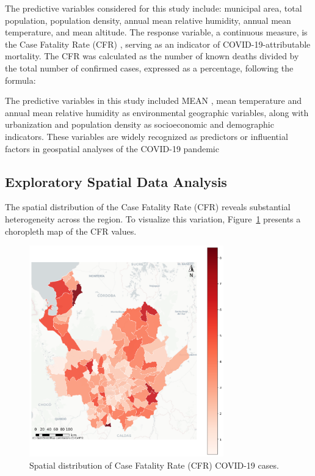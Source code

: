 \documentclass[a4paper,fleqn]{cas-sc}
\begin{document}
The predictive variables considered for this study include: municipal area, total population, population density, annual mean relative humidity, annual mean temperature, and mean altitude. The response variable, a continuous measure, is the Case Fatality Rate (CFR) \citep{Chaparro2021}, serving as an indicator of COVID-19-attributable mortality. The CFR was calculated as the number of known deaths divided by the total number of confirmed cases, expressed as a percentage, following the formula:

The predictive variables in this study included MEAN \citep{Franch-Pardo2020}, mean temperature \citep{Franch-Pardo2020,Ramrez-Aldana2021,Yu2021} and annual mean relative humidity \citep{Franch-Pardo2020,Han2021} as environmental geographic variables, along with urbanization \citep{Dutta2021,Ramrez-Aldana2021} and population density \citep{Franch-Pardo2020,Dutta2021,Bherwani2021,Han2021,Ramrez-Aldana2021,Yu2021,Parvin2021,Yi2021,Putri2023,Wheeler2022} as socioeconomic and demographic indicators. These variables are widely recognized as predictors or influential factors in geospatial analyses of the COVID-19 pandemic

\subsection{Exploratory Spatial Data Analysis}

The spatial distribution of the Case Fatality Rate (CFR) reveals substantial heterogeneity across the region.
To visualize this variation, Figure~\ref{fig:choropleth_cfr} presents a choropleth map of the CFR values.

\begin{figure}[H]
  \centering
  \includegraphics[width=0.75\textwidth]{figures/figure02.png}
  \caption{Spatial distribution of Case Fatality Rate (CFR) COVID-19 cases.}
  \label{fig:choropleth_cfr}
\end{figure}
\end{document}
